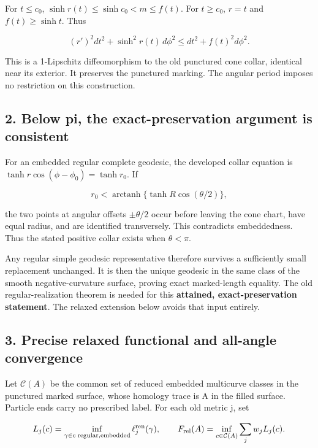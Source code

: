 \documentclass[11pt]{article}
\begin{document}
For \(t\le c_0\), \(\sinh r(t)\le\sinh c_0<m\le f(t)\). For
\(t\ge c_0\), \(r=t\) and \(f(t)\ge\sinh t\). Thus

\[
(r')^2dt^2+\sinh^2r(t)\,d\phi^2
\le dt^2+f(t)^2d\phi^2.
\]

This is a 1-Lipschitz diffeomorphism to the old punctured cone collar,
identical near its exterior. It preserves the punctured marking. The
angular period imposes no restriction on this construction.

\subsection{2. Below pi, the exact-preservation argument is
consistent}\label{below-pi-the-exact-preservation-argument-is-consistent}

For an embedded regular complete geodesic, the developed collar equation
is \(\tanh r\cos(\phi-\phi_0)=\tanh r_0\). If

\[
r_0<\operatorname{arctanh}\{\tanh R\cos(\theta/2)\},
\]

the two points at angular offsets \(\pm\theta/2\) occur before leaving
the cone chart, have equal radius, and are identified transversely. This
contradicts embeddedness. Thus the stated positive collar exists when
\(\theta<\pi\).

Any regular simple geodesic representative therefore survives a
sufficiently small replacement unchanged. It is then the unique geodesic
in the same class of the smooth negative-curvature surface, proving
exact marked-length equality. The old regular-realization theorem is
needed for this \textbf{attained, exact-preservation statement}. The
relaxed extension below avoids that input entirely.

\subsection{3. Precise relaxed functional and all-angle
convergence}\label{precise-relaxed-functional-and-all-angle-convergence}

Let \(\mathcal C(A)\) be the common set of reduced embedded multicurve
classes in the punctured marked surface, whose homology trace is A in
the filled surface. Particle ends carry no prescribed label. For each
old metric j, set

\[
L_j(c)=\inf_{\gamma\in c\;\mathrm{regular,embedded}}\ell_j^{\rm ren}(\gamma),
\qquad
F_{\rm rel}(A)=\inf_{c\in\mathcal C(A)}\sum_jw_j L_j(c).
\]
\end{document}
